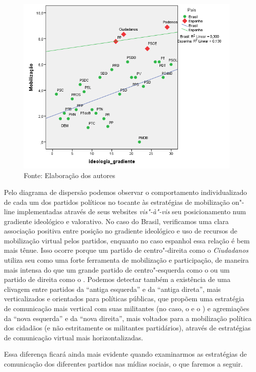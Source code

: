 \begin{figure}[!ht]
\centering
 \includegraphics[width=110mm]{./imgs/graf3.png}
\caption{Fonte: Elaboração dos autores}
\end{figure}

Pelo diagrama de dispersão podemos observar o comportamento
individualizado de cada um dos partidos políticos no tocante às
estratégias de mobilização on"-line implementadas através de seus
websites \emph{vis"-à"-vis} seu posicionamento num gradiente ideológico e
valorativo. No caso do Brasil, verificamos uma clara associação positiva
entre posição no gradiente ideológico e uso de recursos de mobilização
virtual pelos partidos, enquanto no caso espanhol essa relação é bem
mais tênue. Isso ocorre porque um partido de centro"-direita como o
\emph{Ciudadanos} utiliza seu  como uma forte ferramenta de
mobilização e participação, de maneira mais intensa do que um grande
partido de centro"-esquerda como o  ou um partido de direita como o
. Podemos detectar também a existência de uma clivagem entre partidos
da ``antiga esquerda'' e da ``antiga direta'', mais verticalizados e
orientados para políticas públicas, que propõem uma estratégia de
comunicação mais vertical com suas militantes (no caso, o  e o ) e
agremiações da ``nova esquerda'' e da ``nova direita'', mais voltados
para a mobilização política dos cidadãos (e não estritamente os
militantes partidários), através de estratégias de comunicação virtual
mais horizontalizadas.

Essa diferença ficará ainda mais evidente quando examinarmos as
estratégias de comunicação dos diferentes partidos nas mídias sociais, o
que faremos a seguir.

